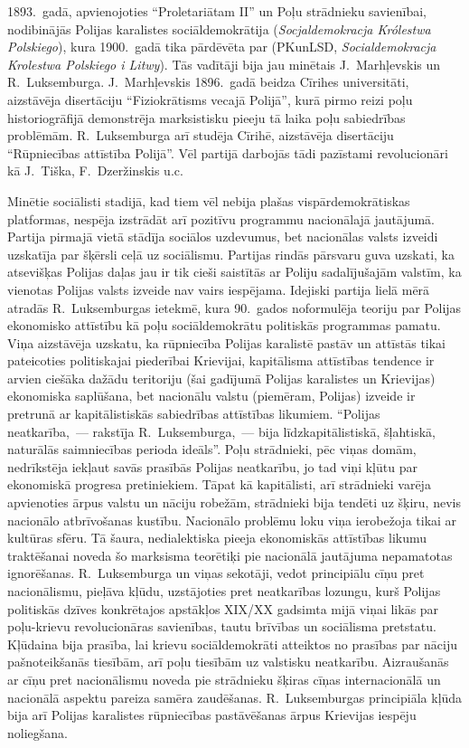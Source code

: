 \documentclass[twoside,a5paper,12pt,fleqn,openany]{extbook}
\newcommand{\pltxti}[1]{\textit{\textpolish{#1}}}
\begin{document}
1893.~gadā, apvienojoties ``Proletariātam II'' un Poļu strādnieku savienībai, nodibinājās Polijas karalistes sociāldemokrātija (\pltxti{Socjaldemokracja Królestwa Polskiego}), kura 1900.~gadā tika pārdēvēta par  (PKunLSD, \pltxti{Socialdemokracja Krolestwa Polskiego i Litwy}). Tās vadītāji bija jau minētais J.~Marhļevskis un R.~Luksemburga. J.~Marhļevskis 1896.~gadā beidza Cīrihes universitāti, aizstāvēja disertāciju ``Fiziokrātisms vecajā Polijā'', kurā pirmo reizi poļu historiogrāfijā demonstrēja marksistisku pieeju tā laika poļu sabiedrības problēmām. R.~Luksemburga arī studēja Cīrihē, aizstāvēja disertāciju ``Rūpniecības attīstība Polijā''. Vēl partijā darbojās tādi pazīstami revolucionāri kā J.~Tiška, F.~Dzeržinskis u.c.

Minētie sociālisti stadijā, kad tiem vēl nebija plašas vispārdemokrātiskas platformas, nespēja izstrādāt arī pozitīvu programmu nacionālajā jautājumā. Partija pirmajā vietā stādīja sociālos uzdevumus, bet nacionālas valsts izveidi uzskatīja par šķērsli ceļā uz sociālismu. Partijas rindās pārsvaru guva uzskati, ka atsevišķas Polijas daļas jau ir tik cieši saistītās ar Poliju sadalījušajām valstīm, ka vienotas Polijas valsts izveide nav vairs iespējama. Idejiski partija lielā mērā atradās R.~Luksemburgas ietekmē, kura 90.~gados noformulēja teoriju par Polijas ekonomisko attīstību kā poļu sociāldemokrātu politiskās programmas pamatu. Viņa aizstāvēja uzskatu, ka rūpniecība Polijas karalistē pastāv un attīstās tikai pateicoties politiskajai piederībai Krievijai, kapitālisma attīstības tendence ir arvien ciešāka dažādu teritoriju (šai gadījumā Polijas karalistes un Krievijas) ekonomiska saplūšana, bet nacionālu valstu (piemēram, Polijas) izveide ir pretrunā ar kapitālistiskās sabiedrības attīstības likumiem. ``Polijas neatkarība,~--- rakstīja R.~Luksemburga,~--- bija līdzkapitālistiskā, šļahtiskā, naturālās saimniecības perioda ideāls''. Poļu strādnieki, pēc viņas domām, nedrīkstēja iekļaut savās prasībās Polijas neatkarību, jo tad viņi kļūtu par ekonomiskā progresa pretiniekiem. Tāpat kā kapitālisti, arī strādnieki varēja apvienoties ārpus valstu un nāciju robežām, strādnieki bija tendēti uz šķiru, nevis nacionālo atbrīvošanas kustību. Nacionālo problēmu loku viņa ierobežoja tikai ar kultūras sfēru. Tā šaura, nedialektiska pieeja ekonomiskās attīstības likumu traktēšanai noveda šo marksisma teorētiķi pie nacionālā jautājuma nepamatotas ignorēšanas. R.~Luksemburga un viņas sekotāji, vedot principiālu cīņu pret nacionālismu, pieļāva kļūdu, uzstājoties pret neatkarības lozungu, kurš Polijas politiskās dzīves konkrētajos apstākļos XIX/XX gadsimta mijā viņai likās par poļu-krievu revolucionāras savienības, tautu brīvības un sociālisma pretstatu. Kļūdaina bija prasība, lai krievu sociāldemokrāti atteiktos no prasības par nāciju pašnoteikšanās tiesībām, arī poļu tiesībām uz valstisku neatkarību. Aizraušanās ar cīņu pret nacionālismu noveda pie strādnieku šķiras cīņas internacionālā un nacionālā aspektu pareiza samēra zaudēšanas. R.~Luksemburgas principiāla kļūda bija arī Polijas karalistes rūpniecības pastāvēšanas ārpus Krievijas iespēju noliegšana.
\end{document}
